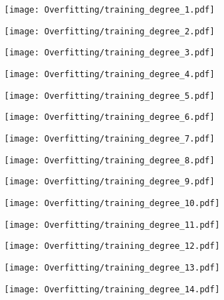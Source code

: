 \documentclass[xcolor=pdftex,dvipsnames,table]{beamer}
\begin{document}
\frame
{
	\begin{center}
		\texttt{[image: Overfitting/training\_degree\_1.pdf]}
	\end{center}
}
\frame
{
	\begin{center}
		\texttt{[image: Overfitting/training\_degree\_2.pdf]}
	\end{center}
}
\frame
{
	\begin{center}
		\texttt{[image: Overfitting/training\_degree\_3.pdf]}
	\end{center}
}
\frame
{
	\begin{center}
		\texttt{[image: Overfitting/training\_degree\_4.pdf]}
	\end{center}
}
\frame
{
	\begin{center}
		\texttt{[image: Overfitting/training\_degree\_5.pdf]}
	\end{center}
}
\frame
{
	\begin{center}
		\texttt{[image: Overfitting/training\_degree\_6.pdf]}
	\end{center}
}
\frame
{
	\begin{center}
		\texttt{[image: Overfitting/training\_degree\_7.pdf]}
	\end{center}
}
\frame
{
	\begin{center}
		\texttt{[image: Overfitting/training\_degree\_8.pdf]}
	\end{center}
}
\frame
{
	\begin{center}
		\texttt{[image: Overfitting/training\_degree\_9.pdf]}
	\end{center}
}
\frame
{
	\begin{center}
		\texttt{[image: Overfitting/training\_degree\_10.pdf]}
	\end{center}
}
\frame
{
	\begin{center}
		\texttt{[image: Overfitting/training\_degree\_11.pdf]}
	\end{center}
}
\frame
{
	\begin{center}
		\texttt{[image: Overfitting/training\_degree\_12.pdf]}
	\end{center}
}
\frame
{
	\begin{center}
		\texttt{[image: Overfitting/training\_degree\_13.pdf]}
	\end{center}
}
\frame
{
	\begin{center}
		\texttt{[image: Overfitting/training\_degree\_14.pdf]}
	\end{center}
}
\end{document}
